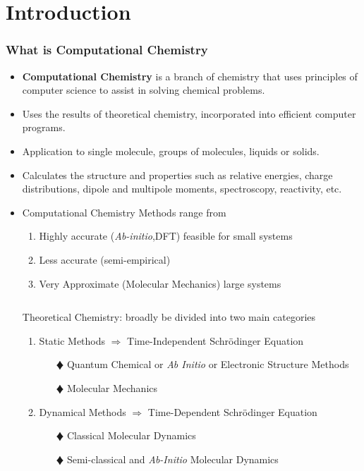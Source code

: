 \documentclass[slidestop,mathserif,compress,xcolor=svgnames]{beamer}
\begin{document}
\section{Introduction}
\begin{frame}[allowframebreaks]
\frametitle{\small What is Computational Chemistry}
\begin{itemize}
\item {\bf Computational Chemistry} is a branch of chemistry that uses principles of computer science to assist in solving chemical problems.
\item Uses the results of theoretical chemistry, incorporated into efficient computer programs.
\item Application to single molecule, groups of molecules, liquids or solids.
\item Calculates the structure and properties such as relative energies, charge distributions, dipole and multipole moments, spectroscopy, reactivity, etc.
\item Computational Chemistry Methods range from
 \begin{enumerate}
  \item Highly accurate ({\it Ab-initio},DFT) feasible for small systems
  \item Less accurate (semi-empirical)
  \item Very Approximate (Molecular Mechanics) large systems
 \end{enumerate}
\vspace{0.5cm}
\begin{columns}
\column{11cm}
\begin{block}{Theoretical Chemistry: broadly be divided into two main categories}
\begin{enumerate}
\item Static Methods {\Large$\Rightarrow$} {\color{blue}Time-Independent Schr\"{o}dinger Equation}
\begin{enumerate}
\item[$\vardiamond$] Quantum Chemical or \emph{Ab Initio} or Electronic Structure Methods
\item[$\vardiamond$] Molecular Mechanics
\end{enumerate}
\item Dynamical Methods {\Large$\Rightarrow$} {\color{blue}Time-Dependent Schr\"{o}dinger Equation}
\begin{enumerate}
\item[$\vardiamond$] Classical Molecular Dynamics
\item[$\vardiamond$] Semi-classical and \textit{Ab-Initio} Molecular Dynamics
\end{enumerate}
\end{enumerate}
\end{block}
\end{columns}
\end{itemize}

\end{frame}
\end{document}
